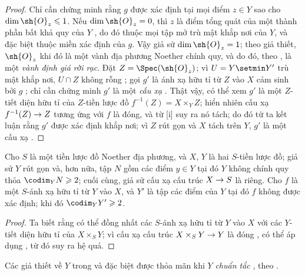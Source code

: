 \documentclass[oneside,10pt]{amsart}
\makeatletter
\renewcommand{\leq}{\leqslant}
\renewcommand{\geq}{\geqslant}
\newcommand{\ega@arrow}[2]{\mathchoice{#1}{#2}{#2}{#2}}
\renewcommand{\to}{\ega@arrow{\longrightarrow}{\rightarrow}}
\let\EGAOriginalLabel\label
\renewcommand{\label}[1]{\phantomsection\EGAOriginalLabel{#1}}
\makeatother
\begin{document}
\begin{proof}
Chỉ cần chứng minh rằng $g$ được xác định tại mọi điểm $z\in Y$ sao cho $\dim\sh{O}_z\leq1$.
Nếu $\dim\sh{O}_z=0$, thì $z$ là điểm tổng quát của một thành phần bất khả quy của $Y$ , do đó thuộc mọi tập mở trù mật khắp nơi của $Y$, và đặc biệt thuộc miền xác định của $g$.
Vậy giả sử $\dim\sh{O}_z=1$; theo giả thiết, $\sh{O}_z$ khi đó là một vành địa phương Noether chính quy, và do đó, theo , là một \emph{vành định giá rời rạc}.
Đặt $Z=\Spec(\sh{O}_z)$;
vì $U=Y\setmin Y'$ trù mật khắp nơi, $U\cap Z$ không rỗng ;
gọi $g'$ là ánh xạ hữu tỉ từ $Z$ vào $X$ cảm sinh bởi $g$ ;
chỉ cần chứng minh $g'$ là một \emph{cấu xạ} .
Thật vậy, có thể xem $g'$ là một $Z$-tiết diện hữu tỉ của $Z$-tiền lược đồ $f^{-1}(Z)=X\times_Y Z$;
hiển nhiên cấu xạ $f^{-1}(Z)\to Z$ tương ứng với $f$ là đóng, và từ [i] suy ra nó tách;
do đó từ  ta kết luận rằng $g'$ được xác định khắp nơi;
vì $Z$ rút gọn và $X$ tách trên $Y$, $g'$ là một cấu xạ .
\end{proof}

\begin{corollary}[7.3.6]
\label{II.7.3.6}
Cho $S$ là một tiền lược đồ Noether địa phương, và $X$, $Y$ là hai $S$-tiền lược đồ;
giả sử $Y$ rút gọn và, hơn nữa, tập $N$ gồm các điểm $y\in Y$ tại đó $Y$ không chính quy thỏa $\codim_Y N\geq2$;
cuối cùng, giả sử cấu xạ cấu trúc $X\to S$ là riêng.
Cho $f$ là một $S$-ánh xạ hữu tỉ từ $Y$ vào $X$, và $Y'$ là tập các điểm của $Y$ tại đó $f$ không được xác định;
khi đó $\codim_Y Y'\geq2$.
\end{corollary}

\begin{proof}
Ta biết  rằng có thể đồng nhất các $S$-ánh xạ hữu tỉ từ $Y$ vào $X$ với các $Y$-tiết diện hữu tỉ của $X\times_S Y$;
vì cấu xạ cấu trúc $X\times_S Y\to Y$ là đóng , có thể áp dụng , từ đó suy ra hệ quả.
\end{proof}

\begin{remark}[7.3.7]
\label{II.7.3.7}
Các giả thiết về $Y$ trong  và  đặc biệt được thỏa mãn khi $Y$ \emph{chuẩn tắc} , theo .
\end{remark}
\end{document}

